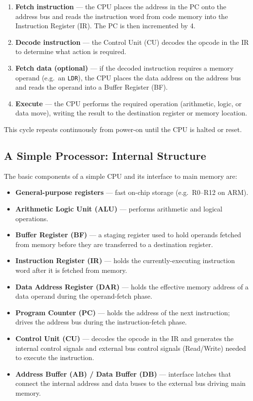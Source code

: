 \documentclass[11pt, a4paper, notitlepage]{report}
\theoremstyle{definition}
\theoremstyle{remark}
\theoremstyle{definition}
\begin{document}
\begin{enumerate}
  \item \textbf{Fetch instruction} --- the CPU places the address in the PC onto the address bus and reads the instruction word from code memory into the Instruction Register (IR). The PC is then incremented by 4.
  \item \textbf{Decode instruction} --- the Control Unit (CU) decodes the opcode in the IR to determine what action is required.
  \item \textbf{Fetch data (optional)} --- if the decoded instruction requires a memory operand (e.g.\ an \texttt{LDR}), the CPU places the data address on the address bus and reads the operand into a Buffer Register (BF).
  \item \textbf{Execute} --- the CPU performs the required operation (arithmetic, logic, or data move), writing the result to the destination register or memory location.
\end{enumerate}

This cycle repeats continuously from power-on until the CPU is halted or reset.

\subsection{A Simple Processor: Internal Structure}

The basic components of a simple CPU and its interface to main memory are:

\begin{itemize}
  \item \textbf{General-purpose registers} --- fast on-chip storage (e.g.\ R0--R12 on ARM).
  \item \textbf{Arithmetic Logic Unit (ALU)} --- performs arithmetic and logical operations.
  \item \textbf{Buffer Register (BF)} --- a staging register used to hold operands fetched from memory before they are transferred to a destination register.
  \item \textbf{Instruction Register (IR)} --- holds the currently-executing instruction word after it is fetched from memory.
  \item \textbf{Data Address Register (DAR)} --- holds the effective memory address of a data operand during the operand-fetch phase.
  \item \textbf{Program Counter (PC)} --- holds the address of the next instruction; drives the address bus during the instruction-fetch phase.
  \item \textbf{Control Unit (CU)} --- decodes the opcode in the IR and generates the internal control signals and external bus control signals (Read/Write) needed to execute the instruction.
  \item \textbf{Address Buffer (AB) / Data Buffer (DB)} --- interface latches that connect the internal address and data buses to the external bus driving main memory.
\end{itemize}
\end{document}

